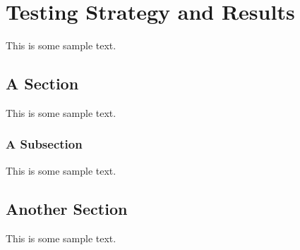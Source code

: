 \chapter{Testing Strategy and Results}

This is some sample text.

\section{A Section}

This is some sample text.

\subsection{A Subsection}

This is some sample text.

\section{Another Section}

This is some sample text.
